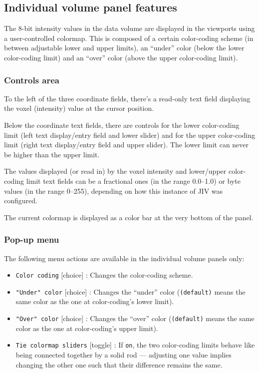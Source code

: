 \subsection{Individual volume panel features}
\label{sec:individual-panel-features}
The 8-bit intensity values in the data volume are displayed in the
viewports using a user-controlled colormap.  This is composed of a
certain color-coding scheme (in between adjustable lower and upper
limits), an ``under'' color (below the lower color-coding limit) and
an ``over'' color (above the upper color-coding limit).

\subsubsection{Controls area}
To the left of the three coordinate fields, there's a read-only text
field displaying the voxel (intensity) value at the cursor position.

Below the coordinate text fields, there are controls for the lower
color-coding limit (left text display/entry field and lower slider)
and for the upper color-coding limit (right text display/entry field
and upper slider).  The lower limit can never be higher than the upper
limit. 

The values displayed (or read in) by the voxel intensity and
lower/upper color-coding limit text fields can be a fractional ones
(in the range 0.0--1.0) or byte values (in the range 0--255),
depending on how this instance of JIV was configured.

The current colormap is displayed as a color bar at the very bottom of
the panel.

\subsubsection{Pop-up menu}
The following menu actions are available in the individual volume
panels only:
\begin{itemize}
\item \verb+Color coding+ [choice] : Changes the color-coding scheme.
\item \verb+"Under" color+ [choice] : Changes the ``under'' color
  (\verb+(default)+ means the same color as the one at color-coding's
  lower limit).
\item \verb+"Over" color+ [choice] : Changes the ``over'' color
  (\verb+(default)+ means the same color as the one at color-coding's
  upper limit).
\item \verb+Tie colormap sliders+ [toggle] : If \verb+on+, the two
  color-coding limits behave like being connected together by a solid
  rod --- adjusting one value implies changing the other one such that
  their difference remains the same.
\end{itemize}


